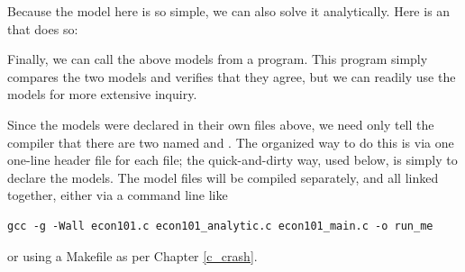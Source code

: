 Because the model here is so simple, we can also solve it analytically.
Here is an  that does so:


Finally, we can call the above models from a program. This program
simply compares the two models and verifies that they agree, but we can
readily use the models for more extensive inquiry.


Since the models were declared in their own files above, we need only
tell the compiler that there are two  named
 and 
. The organized way to do this is via one one-line
header file for each  file; the quick-and-dirty way, used below,
is simply to declare the models. The model files will be compiled
separately, and all linked together, either via a command line like
\begin{lstlisting}
gcc -g -Wall econ101.c econ101_analytic.c econ101_main.c -o run_me
\end{lstlisting}
or using a Makefile as per Chapter \ref{c_crash}.


